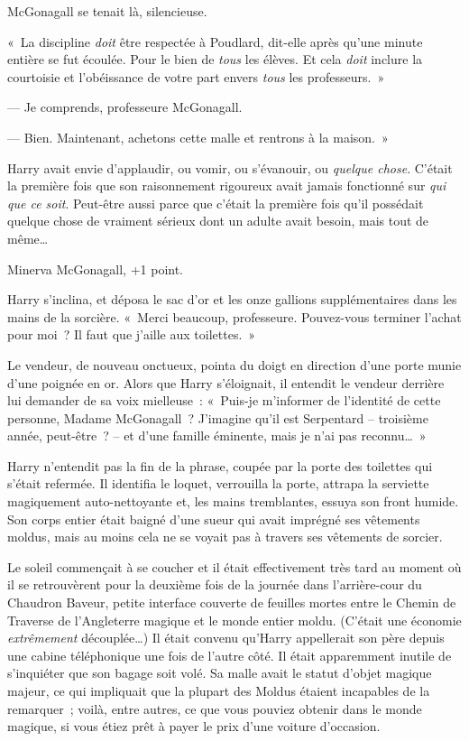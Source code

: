 McGonagall se tenait là, silencieuse.

«~La discipline \emph{doit} être respectée à Poudlard, dit-elle après qu'une minute entière se fut écoulée. Pour le bien de \emph{tous} les élèves. Et cela \emph{doit} inclure la courtoisie et l'obéissance de votre part envers \emph{tous} les professeurs.~»

--- Je comprends, professeure McGonagall.

--- Bien. Maintenant, achetons cette malle et rentrons à la maison.~»

Harry avait envie d'applaudir, ou vomir, ou s'évanouir, ou \emph{quelque chose}.
C'était la première fois que son raisonnement rigoureux avait jamais fonctionné sur \emph{qui que ce soit}.
Peut-être aussi parce que c'était la première fois qu'il possédait quelque chose de vraiment sérieux dont un adulte avait besoin, mais tout de même…

Minerva McGonagall, +1 point.

Harry s'inclina, et déposa le sac d'or et les onze gallions supplémentaires dans les mains de la sorcière.
«~Merci beaucoup, professeure. Pouvez-vous terminer l'achat pour moi~?
Il faut que j'aille aux toilettes.~»

Le vendeur, de nouveau onctueux, pointa du doigt en direction d'une porte munie d'une poignée en or.
Alors que Harry s'éloignait, il entendit le vendeur derrière lui demander de sa voix mielleuse~:
«~Puis-je m'informer de l'identité de cette personne, Madame McGonagall~? J'imagine qu'il est Serpentard -- troisième année, peut-être~? -- et d'une famille éminente, mais je n'ai pas reconnu…~»

Harry n'entendit pas la fin de la phrase, coupée par la porte des toilettes qui s'était refermée.
Il identifia le loquet, verrouilla la porte, attrapa la serviette magiquement auto-nettoyante et, les mains tremblantes, essuya son front humide.
Son corps entier était baigné d'une sueur qui avait imprégné ses vêtements moldus, mais au moins cela ne se voyait pas à travers ses vêtements de sorcier.

\later

Le soleil commençait à se coucher et il était effectivement très tard au moment où il se retrouvèrent pour la deuxième fois de la journée dans l'arrière-cour du Chaudron Baveur, petite interface couverte de feuilles mortes entre le Chemin de Traverse de l'Angleterre magique et le monde entier moldu.
(C'était une économie \emph{extrêmement} découplée…) 
Il était convenu qu'Harry appellerait son père depuis une cabine téléphonique une fois de l'autre côté.
Il était apparemment inutile de s'inquiéter que son bagage soit volé.
Sa malle avait le statut d'objet magique majeur, ce qui impliquait que la plupart des Moldus étaient incapables de la remarquer~;
voilà, entre autres, ce que vous pouviez obtenir dans le monde magique, si vous étiez prêt à payer le prix d'une voiture d'occasion.


